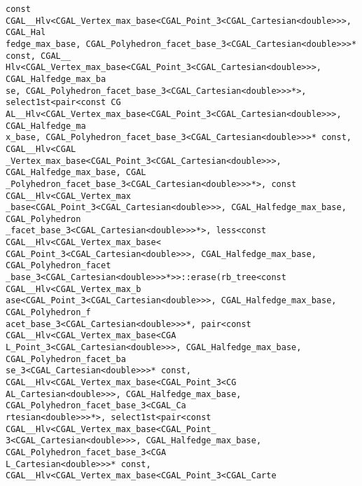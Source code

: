 \begin{titlepage}
{\verb+const CGAL__Hlv<CGAL_Vertex_max_base<CGAL_Point_3<CGAL_Cartesian<double>>>, CGAL_Hal+\\
\verb+fedge_max_base, CGAL_Polyhedron_facet_base_3<CGAL_Cartesian<double>>>* const, CGAL__+\\
\verb+Hlv<CGAL_Vertex_max_base<CGAL_Point_3<CGAL_Cartesian<double>>>, CGAL_Halfedge_max_ba+\\
\verb+se, CGAL_Polyhedron_facet_base_3<CGAL_Cartesian<double>>>*>, select1st<pair<const CG+\\
\verb+AL__Hlv<CGAL_Vertex_max_base<CGAL_Point_3<CGAL_Cartesian<double>>>, CGAL_Halfedge_ma+\\
\verb+x_base, CGAL_Polyhedron_facet_base_3<CGAL_Cartesian<double>>>* const, CGAL__Hlv<CGAL+\\
\verb+_Vertex_max_base<CGAL_Point_3<CGAL_Cartesian<double>>>, CGAL_Halfedge_max_base, CGAL+\\
\verb+_Polyhedron_facet_base_3<CGAL_Cartesian<double>>>*>, const CGAL__Hlv<CGAL_Vertex_max+\\
\verb+_base<CGAL_Point_3<CGAL_Cartesian<double>>>, CGAL_Halfedge_max_base, CGAL_Polyhedron+\\
\verb+_facet_base_3<CGAL_Cartesian<double>>>*>, less<const CGAL__Hlv<CGAL_Vertex_max_base<+\\
\verb+CGAL_Point_3<CGAL_Cartesian<double>>>, CGAL_Halfedge_max_base, CGAL_Polyhedron_facet+\\
\verb+_base_3<CGAL_Cartesian<double>>>*>>::erase(rb_tree<const CGAL__Hlv<CGAL_Vertex_max_b+\\
\verb+ase<CGAL_Point_3<CGAL_Cartesian<double>>>, CGAL_Halfedge_max_base, CGAL_Polyhedron_f+\\
\verb+acet_base_3<CGAL_Cartesian<double>>>*, pair<const CGAL__Hlv<CGAL_Vertex_max_base<CGA+\\
\verb+L_Point_3<CGAL_Cartesian<double>>>, CGAL_Halfedge_max_base, CGAL_Polyhedron_facet_ba+\\
\verb+se_3<CGAL_Cartesian<double>>>* const, CGAL__Hlv<CGAL_Vertex_max_base<CGAL_Point_3<CG+\\
\verb+AL_Cartesian<double>>>, CGAL_Halfedge_max_base, CGAL_Polyhedron_facet_base_3<CGAL_Ca+\\
\verb+rtesian<double>>>*>, select1st<pair<const CGAL__Hlv<CGAL_Vertex_max_base<CGAL_Point_+\\
\verb+3<CGAL_Cartesian<double>>>, CGAL_Halfedge_max_base, CGAL_Polyhedron_facet_base_3<CGA+\\
\verb+L_Cartesian<double>>>* const, CGAL__Hlv<CGAL_Vertex_max_base<CGAL_Point_3<CGAL_Carte+\\
}
\end{titlepage}
